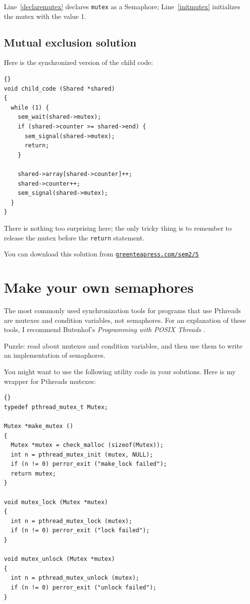\documentclass{book}
\newcommand{\shortlink}[1]{\href{https://greenteapress.com/sem2/#1}{\nolinkurl{greenteapress.com/sem2/#1}}}
\newcommand{\clearemptydoublepage}{\newpage\cleardoublepage}
\begin{document}
Line~\ref{declaremutex} declares {\tt mutex} as a Semaphore;
Line~\ref{initmutex} initializes the mutex with the value 1.


\clearemptydoublepage
\subsection{Mutual exclusion solution}

Here is the synchronized version of the child code:

\begin{lstlisting}[title={}]{}
void child_code (Shared *shared)
{
  while (1) {
    sem_wait(shared->mutex);
    if (shared->counter >= shared->end) {
      sem_signal(shared->mutex);
      return;
    }

    shared->array[shared->counter]++;
    shared->counter++;
    sem_signal(shared->mutex);
  }
}
\end{lstlisting}

There is nothing too surprising here; the only tricky thing
is to remember to release the mutex before the {\tt return}
statement.

You can download this solution from 
\shortlink{5}


\clearemptydoublepage
\section{Make your own semaphores}
\label{makeyourown}

The most commonly used synchronization tools for programs that use
Pthreads are mutexes and condition variables, not semaphores.  For an
explanation of these tools, I recommend Butenhof's {\em Programming
with POSIX Threads} \cite{butenhof}.

Puzzle: read about mutexes and condition variables, and then
use them to write an implementation of semaphores.

You might want to use the following utility code in your solutions.
Here is my wrapper for Pthreads mutexes:

\begin{lstlisting}[title={}]{}
typedef pthread_mutex_t Mutex;

Mutex *make_mutex ()
{
  Mutex *mutex = check_malloc (sizeof(Mutex));
  int n = pthread_mutex_init (mutex, NULL);
  if (n != 0) perror_exit ("make_lock failed"); 
  return mutex;
}

void mutex_lock (Mutex *mutex)
{
  int n = pthread_mutex_lock (mutex);
  if (n != 0) perror_exit ("lock failed");
}

void mutex_unlock (Mutex *mutex)
{
  int n = pthread_mutex_unlock (mutex);
  if (n != 0) perror_exit ("unlock failed");
}
\end{lstlisting}
\end{document}
